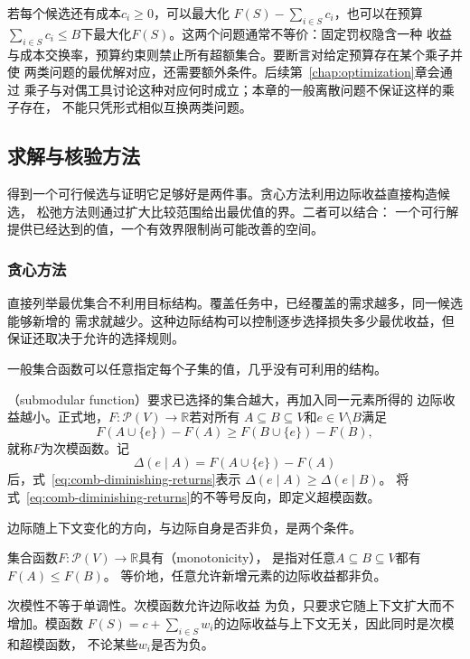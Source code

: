 若每个候选还有成本$c_i\geq0$，可以最大化
$F(S)-\sum_{i\in S}c_i$，也可以在预算
$\sum_{i\in S}c_i\leq B$下最大化$F(S)$。这两个问题通常不等价：固定罚权隐含一种
收益与成本交换率，预算约束则禁止所有超额集合。要断言对给定预算存在某个乘子并使
两类问题的最优解对应，还需要额外条件。后续第~\ref{chap:optimization}章会通过
乘子与对偶工具讨论这种对应何时成立；本章的一般离散问题不保证这样的乘子存在，
不能只凭形式相似互换两类问题。

\subsection{求解与核验方法}
\label{sec:comb-methods-certificates}

得到一个可行候选与证明它足够好是两件事。贪心方法利用边际收益直接构造候选，
松弛方法则通过扩大比较范围给出最优值的界。二者可以结合：
一个可行解提供已经达到的值，一个有效界限制尚可能改善的空间。

\subsubsection{贪心方法}
\label{sec:comb-greedy-method}

直接列举最优集合不利用目标结构。覆盖任务中，已经覆盖的需求越多，同一候选能够新增的
需求就越少。这种边际结构可以控制逐步选择损失多少最优收益，但保证还取决于允许的选择规则。

一般集合函数可以任意指定每个子集的值，几乎没有可利用的结构。
\begin{definition}[次模函数与边际收益]
\label{def:comb-submodular-function}
（submodular function）要求已选择的集合越大，再加入同一元素所得的
边际收益越小。正式地，$F:\mathcal{P}(V)\to\mathbb{R}$若对所有
$A\subseteq B\subseteq V$和$e\in V\setminus B$满足
\begin{equation}
  F(A\cup\{e\})-F(A)
  \geq
  F(B\cup\{e\})-F(B),
  \label{eq:comb-diminishing-returns}
\end{equation}
就称$F$为次模函数。记
\[
  \Delta(e\mid A)=F(A\cup\{e\})-F(A)
\]
后，式~\eqref{eq:comb-diminishing-returns}表示
$\Delta(e\mid A)\geq\Delta(e\mid B)$。
将式~\eqref{eq:comb-diminishing-returns}的不等号反向，即定义超模函数。
\end{definition}

边际随上下文变化的方向，与边际自身是否非负，是两个条件。
\begin{definition}[集合函数的单调性]
\label{def:comb-monotone-set-function}
集合函数$F:\mathcal P(V)\to\mathbb R$具有（monotonicity），
是指对任意$A\subseteq B\subseteq V$都有$F(A)\leq F(B)$。
等价地，任意允许新增元素的边际收益都非负。
\end{definition}
次模性不等于单调性。次模函数允许边际收益
为负，只要求它随上下文扩大而不增加。模函数
$F(S)=c+\sum_{i\in S}w_i$的边际收益与上下文无关，因此同时是次模和超模函数，
不论某些$w_i$是否为负。

